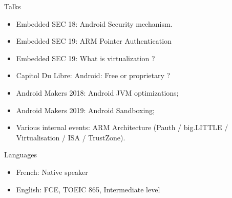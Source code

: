 \documentclass[a4paper, 10pt]{article}
\begin{document}
\begin{section} {Talks}
    \begin{skills}
	\begin{itemize}[parsep=0cm,itemsep=0cm,topsep=0cm]
	    \item Embedded SEC 18: Android Security mechanism.
	    \item Embedded SEC 19: ARM Pointer Authentication
	    \item Embedded SEC 19: What is virtualization ?
	    \item Capitol Du Libre: Android: Free or proprietary ?
	    \item Android Makers 2018: Android JVM optimizations;
	    \item Android Makers 2019: Android Sandboxing;
	    \item Various internal events: ARM Architecture (Pauth / big.LITTLE / Virtualisation / ISA / TrustZone).
	\end{itemize}
    \end{skills}
\end{section}

\begin{section} {Languages}
    \begin{languages}
	\begin{itemize}[parsep=0cm,itemsep=0cm,topsep=0cm]
	    \item French: Native speaker
	    \item English: FCE, TOEIC 865, Intermediate level
	\end{itemize}
    \end{languages}
\end{section}
\end{document}
